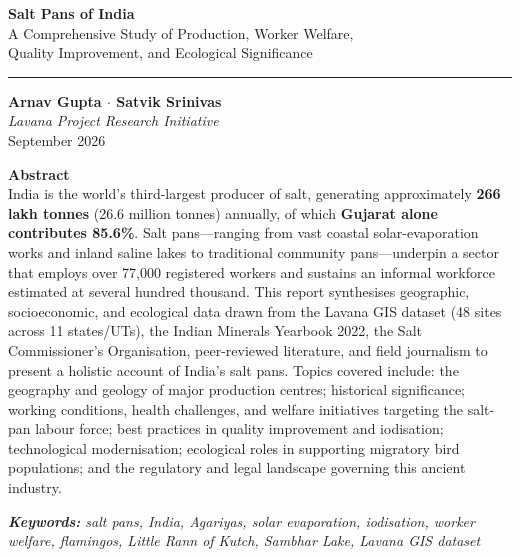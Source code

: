\documentclass[12pt,a4paper]{article}
\begin{document}
\begin{titlepage}
\begin{center}
  \vspace*{2cm}
  {\fontsize{32}{40}\selectfont\bfseries\sffamily\color{deepteal}
    Salt Pans of India}\\[0.8em]
  {\Large\sffamily\color{medteal}
    A Comprehensive Study of Production, Worker Welfare,\\[0.3em]
    Quality Improvement, and Ecological Significance}

  \vspace{1.5em}
  {\color{accent}\rule{0.6\textwidth}{2pt}}

  \vspace{1.5em}
  {\large\bfseries\sffamily Arnav Gupta \quad $\cdot$ \quad Satvik Srinivas}\\[0.4em]
  {\itshape\color{muted} Lavana Project Research Initiative}\\[0.3em]
  {\color{muted} September 2026}

  \vspace{2.5em}
  \begin{abstractbox}
    {\bfseries\sffamily\color{deepteal} Abstract}\\[0.5em]
    India is the world's third-largest producer of salt, generating approximately
    \textbf{266 lakh tonnes} (26.6 million tonnes) annually, of which \textbf{Gujarat
    alone contributes 85.6\%}. Salt pans—ranging from vast coastal solar-evaporation
    works and inland saline lakes to traditional community pans—underpin a sector that
    employs over 77,000 registered workers and sustains an informal workforce estimated
    at several hundred thousand. This report synthesises geographic, socioeconomic, and
    ecological data drawn from the Lavana GIS dataset (48 sites across 11 states/UTs),
    the Indian Minerals Yearbook 2022, the Salt Commissioner's Organisation, peer-reviewed
    literature, and field journalism to present a holistic account of India's salt pans.
    Topics covered include: the geography and geology of major production centres;
    historical significance; working conditions, health challenges, and welfare initiatives
    targeting the salt-pan labour force; best practices in quality improvement and
    iodisation; technological modernisation; ecological roles in supporting migratory
    bird populations; and the regulatory and legal landscape governing this ancient industry.
  \end{abstractbox}

  \vspace{1.2em}
  {\small\itshape\color{muted}
    \textbf{Keywords:} salt pans, India, Agariyas, solar evaporation, iodisation,
    worker welfare, flamingos, Little Rann of Kutch, Sambhar Lake, Lavana GIS dataset}
\end{center}
\end{titlepage}
\end{document}

